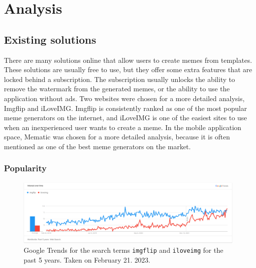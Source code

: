 \chapter{Analysis}

\section{Existing solutions}

There are many solutions online that allow users to create memes from templates.\cite{imgflip-1} These solutions are usually free to use, but they offer some extra features that are locked behind a subscription. The subscription usually unlocks the ability to remove the watermark from the generated memes, or the ability to use the application without ads. Two websites were chosen for a more detailed analysis, Imgflip and iLoveIMG. Imgflip is consistently ranked as one of the most popular meme generators on the internet\cite{imgflip-1}\cite{imgflip-2}, and iLoveIMG is one of the easiest sites to use when an inexperienced user wants to create a meme.\cite{imgflip-1} In the mobile application space, Mematic was chosen for a more detailed analysis, because it is often mentioned as one of the best meme generators on the market.\cite{mematic-1}\cite{mematic-2}\cite{mematic-3}

\subsection{Popularity}

\begin{figure}
    \centering
    \includegraphics[width=\linewidth]{text/img/meme_trends.png}
    \caption{\label{fig:meme-trends}Google Trends for the search terms \texttt{imgflip} and \texttt{iloveimg} for the past 5 years. Taken on February 21. 2023.\cite{trends.google.com}}
\end{figure}

